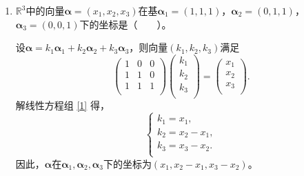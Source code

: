 \begin{enumerate}[1~]
\begin{enumerate}[1.~]
\item
$\mathbb{R}^3$中的向量$\boldsymbol{\alpha} = (x_1, x_2, x_3) $在基$\boldsymbol{\alpha}_1 = (1, 1, 1)$，$\boldsymbol{\alpha}_2 = (0, 1, 1)$，$\boldsymbol{\alpha}_3 = (0, 0, 1)$下的坐标是（\ \ \ \ ）。
\begin{solution}
设$\boldsymbol{\alpha} = k_1 \boldsymbol{\alpha}_1+k_2 \boldsymbol{\alpha}_2+k_3 \boldsymbol{\alpha}_3$，则向量$(k_1, k_2, k_3)$满足\begin{equation}\label{1}
\left( \begin{matrix}
	1&		0&		0\\
	1&		1&		0\\
	1&		1&		1\\
\end{matrix} \right) \left( \begin{array}{c}
	k_1\\
	k_2\\
	k_3\\
\end{array} \right) =\left( \begin{array}{c}
	x_1\\
	x_2\\
	x_3\\
\end{array} \right).\end{equation}
解线性方程组 \eqref{1} 得，\[
\left\{ \begin{array}{l}
	k_1=x_1,\\
	k_2=x_2-x_1,\\
	k_3=x_3-x_2.\\
\end{array} \right. \]
因此，$\boldsymbol{\alpha}$在$\boldsymbol{\alpha}_1, \boldsymbol{\alpha}_2, \boldsymbol{\alpha}_3$下的坐标为$(x_1, x_2-x_1, x_3-x_2)$。
\end{solution}


\end{enumerate}
\end{enumerate}
